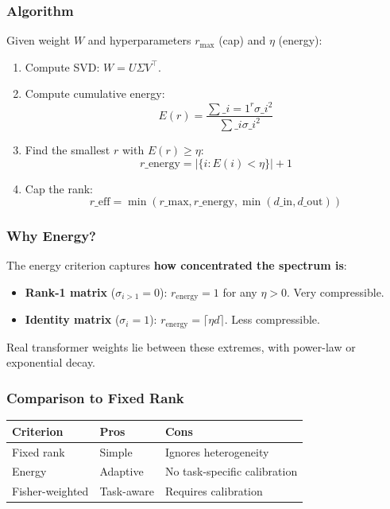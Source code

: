 \subsubsection{Algorithm}

Given weight $W$ and hyperparameters $r_\text{max}$ (cap) and $\eta$ (energy):

\begin{enumerate}
\item Compute SVD: $W = U \Sigma V^\top$.
\item Compute cumulative energy:
  $$
  E(r) = \frac{\sum\_{i=1}^{r} \sigma\_i^2}{\sum\_i \sigma\_i^2}
  \tag{4.3}
  $$
\item Find the smallest $r$ with $E(r) \geq \eta$:
  $$
  r\_\text{energy} = \left|\{i : E(i) < \eta\}\right| + 1
  \tag{4.4}
  $$
\item Cap the rank:
  $$
  r\_\text{eff} = \min(r\_\text{max}, r\_\text{energy}, \min(d\_\text{in}, d\_\text{out}))
  \tag{4.5}
  $$

\end{enumerate}
\subsubsection{Why Energy?}

The energy criterion captures \textbf{how concentrated the spectrum is}:

\begin{itemize}
\item \textbf{Rank-1 matrix} ($\sigma_{i>1} = 0$): $r_\text{energy} = 1$ for any
  $\eta > 0$. Very compressible.
\item \textbf{Identity matrix} ($\sigma_i = 1$): $r_\text{energy} = \lceil \eta d \rceil$.
  Less compressible.

\end{itemize}
Real transformer weights lie between these extremes, with power-law or 
exponential decay.

\subsubsection{Comparison to Fixed Rank}

\begin{table}[H]
\centering
\small
\begin{tabular}{lll}
\toprule
\textbf{Criterion} & \textbf{Pros} & \textbf{Cons} \\
\midrule
Fixed rank & Simple & Ignores heterogeneity \\
Energy & Adaptive & No task-specific calibration \\
Fisher-weighted & Task-aware & Requires calibration \\
\bottomrule
\end{tabular}
\end{table}

